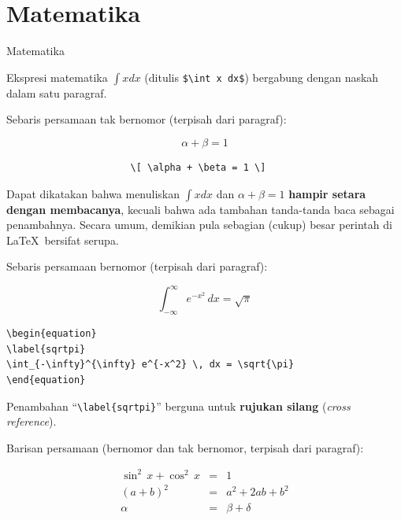 \documentclass[11pt,            %
               aspectratio=169, %
               xcolor=svgnames,
               t                %
               ]{beamer}
\begin{document}
\section{Matematika}
\begin{frame}{Matematika}
\label{math}

Ekspresi matematika $\int x dx$  (ditulis \verb|$\int x dx$|) bergabung dengan naskah dalam satu paragraf.

\bigskip

Sebaris persamaan tak bernomor (terpisah dari paragraf):

\[ \alpha + \beta = 1 \]

\begin{block}{}
\begin{verbatim}
                      \[ \alpha + \beta = 1 \]
\end{verbatim}
\end{block}

\bigskip

Dapat dikatakan bahwa menuliskan $\int x dx$ dan $\alpha + \beta = 1$ \textbf{hampir setara dengan membacanya}, kecuali bahwa ada tambahan tanda-tanda baca sebagai penambahnya. Secara umum, demikian pula sebagian (cukup) besar perintah di \LaTeX~bersifat serupa.

\newpage
Sebaris persamaan bernomor (terpisah dari paragraf):

\begin{equation}
\label{sqrtpi}
\int_{-\infty}^{\infty} e^{-x^2} \, dx = \sqrt{\pi}
\end{equation}

\begin{block}{}
\begin{verbatim}
\begin{equation}
\label{sqrtpi}
\int_{-\infty}^{\infty} e^{-x^2} \, dx = \sqrt{\pi}
\end{equation}
\end{verbatim}
\end{block}

\bigskip

Penambahan ``\verb|\label{sqrtpi}|'' berguna untuk \textbf{rujukan silang} (\textit{cross reference}).


\newpage
Barisan persamaan (bernomor dan tak bernomor, terpisah dari paragraf):

\begin{eqnarray}
\sin^2\,x + \cos^2\,x &=& 1\\
(a + b)^2             &=& a^2 + 2ab + b^2\nonumber\\
\alpha &=& \beta + \delta
\end{eqnarray}


\end{frame}
\end{document}
